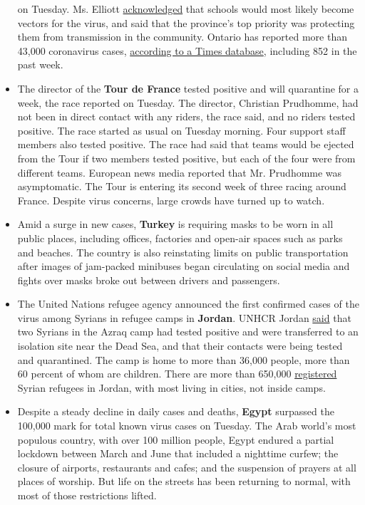 \begin{itemize}
  on Tuesday. Ms. Elliott
  \href{https://www.cbc.ca/news/canada/toronto/covid-19-coronavirus-ontario-september-8-update-1.5715518}{acknowledged}
  that schools would most likely become vectors for the virus, and said
  that the province's top priority was protecting them from transmission
  in the community. Ontario has reported more than 43,000 coronavirus
  cases,
  \href{https://www.nytimes3xbfgragh.onion/interactive/2020/world/canada/canada-coronavirus-cases.html\#states}{according
  to a Times database}, including 852 in the past week.
\item
  The director of the \textbf{Tour de France} tested positive and will
  quarantine for a week, the race reported on Tuesday. The director,
  Christian Prudhomme, had not been in direct contact with any riders,
  the race said, and no riders tested positive. The race started as
  usual on Tuesday morning. Four support staff members also tested
  positive. The race had said that teams would be ejected from the Tour
  if two members tested positive, but each of the four were from
  different teams. European news media reported that Mr. Prudhomme was
  asymptomatic. The Tour is entering its second week of three racing
  around France. Despite virus concerns, large crowds have turned up to
  watch.
\item
  Amid a surge in new cases, \textbf{Turkey} is requiring masks to be
  worn in all public places, including offices, factories and open-air
  spaces such as parks and beaches. The country is also reinstating
  limits on public transportation after images of jam-packed minibuses
  began circulating on social media and fights over masks broke out
  between drivers and passengers.
\item
  The United Nations refugee agency announced the first confirmed cases
  of the virus among Syrians in refugee camps in \textbf{Jordan}. UNHCR
  Jordan
  \href{https://twitter.com/UNHCRJordan/status/1303287100012457986?s=20}{said}
  that two Syrians in the Azraq camp had tested positive and were
  transferred to an isolation site near the Dead Sea, and that their
  contacts were being tested and quarantined. The camp is home to more
  than 36,000 people, more than 60 percent of whom are children. There
  are more than 650,000
  \href{http://data2.unhcr.org/en/situations/syria/location/36\#_ga=2.164954490.47868670.1599589217-32837493.1599589217}{registered}
  Syrian refugees in Jordan, with most living in cities, not inside
  camps.
\item
  Despite a steady decline in daily cases and deaths, \textbf{Egypt}
  surpassed the 100,000 mark for total known virus cases on Tuesday. The
  Arab world's most populous country, with over 100 million people,
  Egypt endured a partial lockdown between March and June that included
  a nighttime curfew; the closure of airports, restaurants and cafes;
  and the suspension of prayers at all places of worship. But life on
  the streets has been returning to normal, with most of those
  restrictions lifted.
\end{itemize}


